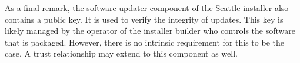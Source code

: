 As a final remark, the software updater component of the
Seattle installer also contains a public key. It is used to
verify the integrity of updates. This key is likely managed by
the operator of the installer builder who controls the software
that is packaged. However, there is no intrinsic requirement for this
to be the case. A trust relationship may extend to
this component as well.
